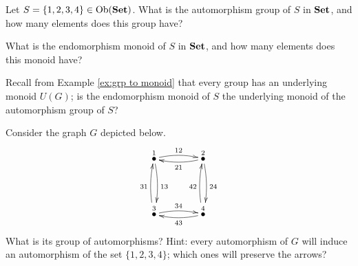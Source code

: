 \documentclass[CT4S-EN-RU]{subfiles}
\begin{document}
\begin{exampleRUS}
\end{exampleRUS}

\begin{exerciseENG}
Let $S=\{1,2,3,4\}\in\textnormal{Ob}({\bf Set})$.
\sexc What is the automorphism group of $S$ in ${\bf Set}$, and how many elements does this group have?
\item What is the endomorphism monoid of $S$ in ${\bf Set}$, and how many elements does this monoid have? 
\item Recall from Example \ref{ex:grp to monoid} that every group has an underlying monoid $U(G)$; is the endomorphism monoid of $S$ the underlying monoid of the automorphism group of $S$?
\endsexc
\end{exerciseENG}

\begin{exerciseRUS}
\end{exerciseRUS}

\begin{exerciseENG}\label{exc:symmetric square}
Consider the graph $G$ depicted below. 
$$
\xymatrix@=40pt{
\LMO{1}\ar@/^.3pc/[r]^{12}\ar@/^.3pc/[d]^{13}&\LMO{2}\ar@/^.3pc/[d]^{24}\ar@/^.3pc/[l]^{21}\\
\LMO{3}\ar@/^.3pc/[r]^{34}\ar@/^.3pc/[u]^{31}&\LMO{4}\ar@/^.3pc/[u]^{42}\ar@/^.3pc/[l]^{43}
}
$$
What is its group of automorphisms? Hint: every automorphism of $G$ will induce an automorphism of the set $\{1,2,3,4\}$; which ones will preserve the arrows?
\end{exerciseENG}

\begin{exerciseRUS}\label{exc:symmetric square}
\end{exerciseRUS}


\subsubsection{}\label{sec:preorder as cat}
\end{document}
